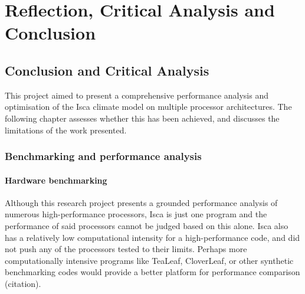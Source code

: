 \documentclass[a4paper,11pt]{report}
\begin{document}
\part{Reflection, Critical Analysis and Conclusion}

\chapter{Conclusion and Critical Analysis}
This project aimed to present a comprehensive performance analysis and optimisation of the Isca climate model on multiple processor architectures. The following chapter assesses whether this has been achieved, and discusses the limitations of the work presented. 
\par
\section{Benchmarking and performance analysis}
\subsection{Hardware benchmarking}
Although this research project presents a grounded performance analysis of numerous high-performance processors, Isca is just one program and the performance of said processors cannot be judged based on this alone. Isca also has a relatively low computational intensity for a high-performance code, and did not push any of the processors tested to their limits. Perhaps more computationally intensive programs like TeaLeaf, CloverLeaf, or other synthetic benchmarking codes would provide a better platform for performance comparison (citation).
\end{document}
